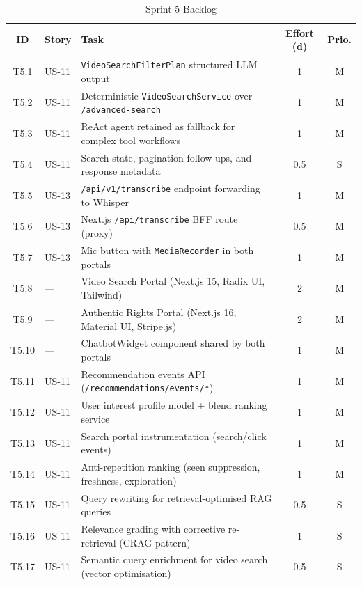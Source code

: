 \begin{table}[H]
\centering
\caption{Sprint 5 Backlog}
\label{tab:sprint5_backlog}
\begin{tabularx}{\textwidth}{clXcc}
\toprule
\textbf{ID} & \textbf{Story} & \textbf{Task} & \textbf{Effort (d)} & \textbf{Prio.} \\
\midrule
T5.1 & US-11 & \texttt{VideoSearchFilterPlan} structured LLM output              & 1 & M \\
T5.2 & US-11 & Deterministic \texttt{VideoSearchService} over \texttt{/advanced-search} & 1 & M \\
T5.3 & US-11 & ReAct agent retained as fallback for complex tool workflows & 1 & M \\
T5.4 & US-11 & Search state, pagination follow-ups, and response metadata             & 0.5 & S \\
T5.5 & US-13 & \texttt{/api/v1/transcribe} endpoint forwarding to Whisper        & 1 & M \\
T5.6 & US-13 & Next.js \texttt{/api/transcribe} BFF route (proxy)                 & 0.5 & M \\
T5.7 & US-13 & Mic button with \texttt{MediaRecorder} in both portals             & 1 & M \\
T5.8 & —     & Video Search Portal (Next.js 15, Radix UI, Tailwind)              & 2 & M \\
T5.9 & —     & Authentic Rights Portal (Next.js 16, Material UI, Stripe.js)       & 2 & M \\
T5.10 & —     & ChatbotWidget component shared by both portals                    & 1 & M \\
T5.11 & US-11 & Recommendation events API (\texttt{/recommendations/events/*})      & 1 & M \\
T5.12 & US-11 & User interest profile model + blend ranking service               & 1 & M \\
T5.13 & US-11 & Search portal instrumentation (search/click events)               & 1 & M \\
T5.14 & US-11 & Anti-repetition ranking (seen suppression, freshness, exploration) & 1 & M \\
T5.15 & US-11 & Query rewriting for retrieval-optimised RAG queries               & 0.5 & S \\
T5.16 & US-11 & Relevance grading with corrective re-retrieval (CRAG pattern)     & 1   & S \\
T5.17 & US-11 & Semantic query enrichment for video search (vector optimisation)  & 0.5 & S \\
\bottomrule
\end{tabularx}
\end{table}

